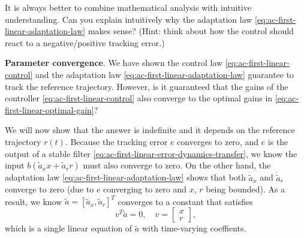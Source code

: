 \documentclass[
]{book}
\theoremstyle{definition}
\theoremstyle{definition}
\theoremstyle{definition}
\theoremstyle{definition}
\theoremstyle{remark}
\begin{document}
It is always better to combine mathematical analysis with intuitive understanding. Can you explain intuitively why the adaptation law \eqref{eq:ac-first-linear-adaptation-law} makes sense? (Hint: think about how the control should react to a negative/positive tracking error.)

\textbf{Parameter convergence}. We have shown the control law \eqref{eq:ac-first-linear-control} and the adaptation law \eqref{eq:ac-first-linear-adaptation-law} guarantee to track the reference trajectory. However, is it guaranteed that the gains of the controller \eqref{eq:ac-first-linear-control} also converge to the optimal gains in \eqref{eq:ac-first-linear-optimal-gain}?

We will now show that the answer is indefinite and it depends on the reference trajectory \(r(t)\). Because the tracking error \(e\) converges to zero, and \(e\) is the output of a stable filter \eqref{eq:ac-first-linear-error-dynamics-transfer}, we know the input \(b(\tilde{a}_x x + \tilde{a}_r r)\) must also converge to zero. On the other hand, the adaptation law \eqref{eq:ac-first-linear-adaptation-law} shows that both \(\dot{\tilde{a}}_x\) and \(\dot{\tilde{a}}_r\) converge to zero (due to \(e\) converging to zero and \(x\), \(r\) being bounded). As a result, we know \(\tilde{a} = [\tilde{a}_x,\tilde{a}_r]^T\) converges to a constant that satisfies
\begin{equation}
v^T \tilde{a} = 0, \quad v = \begin{bmatrix} x \\ r \end{bmatrix},
\label{eq:ac-first-linear-parameter-equation}
\end{equation}
which is a single linear equation of \(\tilde{a}\) with time-varying coeffients.
\end{document}
